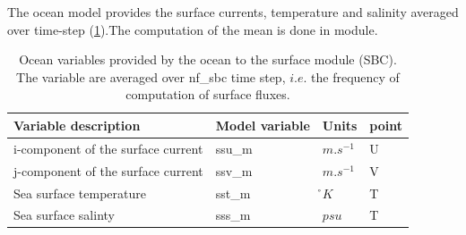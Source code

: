 %
%
%
%
%
%
%

The ocean model provides the surface currents, temperature and salinity 
averaged over  time-step (\ref{Tab_ssm}).The computation of the 
mean is done in  module.

\begin{table}[tb]   \begin{center}   \begin{tabular}{|l|l|l|l|}
\hline
Variable description					& Model variable	& Units	& point \\	\hline
i-component of the surface current	& ssu\_m	& $m.s^{-1}$	& U \\	\hline
j-component of the surface current	& ssv\_m	& $m.s^{-1}$	& V \\	\hline
Sea surface temperature				& sst\_m	& \r{}$K$		& T \\	\hline
Sea surface salinty					& sss\_m	& $psu$			& T \\	\hline
\end{tabular}
\caption{  \label{Tab_ssm}   
Ocean variables provided by the ocean to the surface module (SBC). 
The variable are averaged over nf{\_}sbc time step, $i.e.$ the frequency of 
computation of surface fluxes.}
\end{center}   \end{table}



